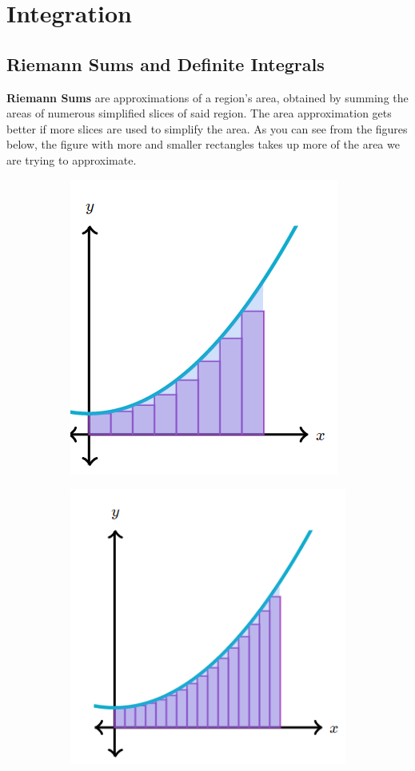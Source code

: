 \section{Integration}

    \subsection{Riemann Sums and Definite Integrals}
        \textbf{Riemann Sums} are approximations of a region's area, obtained by summing the
        areas of numerous simplified slices of said region. The area approximation gets better
        if more slices are used to simplify the area. As you can see from the figures below,
        the figure with more and smaller rectangles takes up more of the area we are trying to
        approximate.

        \begin{figure} [hbt!]
            \centering
            \begin{subfigure}[b]{.45\textwidth}
                \includegraphics[scale=0.8]{Resources/Unit4Integration/Riemann1}
            \end{subfigure}
            \begin{subfigure}[b]{.45\textwidth}
                \includegraphics[scale=0.8]{Resources/Unit4Integration/Riemann2}
            \end{subfigure}
        \end{figure}

